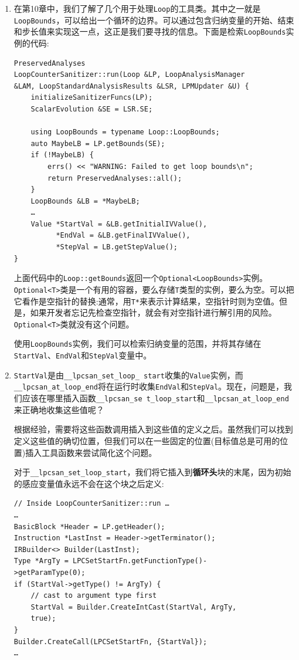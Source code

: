 \begin{enumerate}
\item 在第10章中，我们了解了几个用于处理\texttt{Loop}的工具类。其中之一就是\texttt{LoopBounds}，可以给出一个循环的边界。可以通过包含归纳变量的开始、结束和步长值来实现这一点，这正是我们要寻找的信息。下面是检索\texttt{LoopBounds}实例的代码:

\begin{lstlisting}[style=styleCXX]
PreservedAnalyses
LoopCounterSanitizer::run(Loop &LP, LoopAnalysisManager
&LAM, LoopStandardAnalysisResults &LSR, LPMUpdater &U) {
	initializeSanitizerFuncs(LP);
	ScalarEvolution &SE = LSR.SE;
	
	using LoopBounds = typename Loop::LoopBounds;
	auto MaybeLB = LP.getBounds(SE);
	if (!MaybeLB) {
		errs() << "WARNING: Failed to get loop bounds\n";
		return PreservedAnalyses::all();
	}
	LoopBounds &LB = *MaybeLB;
	…
	Value *StartVal = &LB.getInitialIVValue(),
		  *EndVal = &LB.getFinalIVValue(),
		  *StepVal = LB.getStepValue();
}
\end{lstlisting}

上面代码中的\texttt{Loop::getBounds}返回一个\texttt{Optional<LoopBounds>}实例。\texttt{Optional<T>}类是一个有用的容器，要么存储\texttt{T}类型的实例，要么为空。可以把它看作是空指针的替换:通常，用\texttt{T*}来表示计算结果，空指针时则为空值。但是，如果开发者忘记先检查空指针，就会有对空指针进行解引用的风险。\texttt{Optional<T>}类就没有这个问题。

使用\texttt{LoopBounds}实例，我们可以检索归纳变量的范围，并将其存储在\texttt{StartVal}、\texttt{EndVal}和\texttt{StepVal}变量中。

\item \texttt{StartVal}是由\texttt{\_\_lpcsan\_set\_loop\_ start}收集的\texttt{Value}实例，而\texttt{\_\_lpcsan\_at\_loop\_end}将在运行时收集\texttt{EndVal}和\texttt{StepVal}。现在，问题是，我们应该在哪里插入函数\texttt{\_\_lpcsan\_se t\_loop\_start}和\texttt{\_\_lpcsan\_at\_loop\_end}来正确地收集这些值呢？

根据经验，需要将这些函数调用插入到这些值的定义之后。虽然我们可以找到定义这些值的确切位置，但我们可以在一些固定的位置(目标值总是可用的位置)插入工具函数来尝试简化这个问题。

对于\texttt{\_\_lpcsan\_set\_loop\_start}，我们将它插入到\textbf{循环头}块的末尾，因为初始的感应变量值永远不会在这个块之后定义:

\begin{lstlisting}[style=styleCXX]
// Inside LoopCounterSanitizer::run …
…
BasicBlock *Header = LP.getHeader();
Instruction *LastInst = Header->getTerminator();
IRBuilder<> Builder(LastInst);
Type *ArgTy = LPCSetStartFn.getFunctionType()-
>getParamType(0);
if (StartVal->getType() != ArgTy) {
	// cast to argument type first
	StartVal = Builder.CreateIntCast(StartVal, ArgTy,
	true);
}
Builder.CreateCall(LPCSetStartFn, {StartVal});
…
\end{lstlisting}


\end{enumerate}
